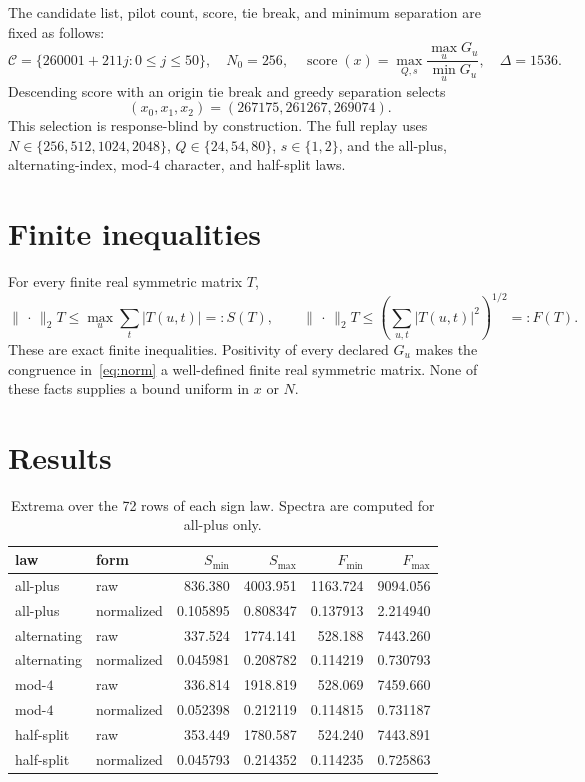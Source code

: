 \documentclass[10pt]{article}
\newcommand{\opnorm}{\lVert\,\cdot\,\rVert_2}
\begin{document}
The candidate list, pilot count, score, tie break, and minimum separation are
fixed as follows:
\begin{equation}
 \mathcal C=\{260001+211j:0\leq j\leq50\},\quad N_0=256,
 \quad \operatorname{score}(x)=\max_{Q,s}\frac{\max_uG_u}{\min_uG_u},
 \quad \Delta=1536.
\end{equation}
Descending score with an origin tie break and greedy separation selects
\begin{equation}
 (x_0,x_1,x_2)=(267175,261267,269074).
 \label{eq:origins}
\end{equation}
This selection is response-blind by construction.  The full replay uses
$N\in\{256,512,1024,2048\}$, $Q\in\{24,54,80\}$, $s\in\{1,2\}$, and the
all-plus, alternating-index, mod-$4$ character, and half-split laws.

\section{Finite inequalities}

For every finite real symmetric matrix $T$,
\begin{equation}
 \opnorm{T}\leq\max_u\sum_t|T(u,t)|=:S(T),
 \qquad \opnorm{T}\leq\left(\sum_{u,t}|T(u,t)|^2\right)^{1/2}=:F(T).
 \label{eq:envelopes}
\end{equation}
These are exact finite inequalities.  Positivity of every declared $G_u$ makes
the congruence in~\eqref{eq:norm} a well-defined finite real symmetric matrix.
None of these facts supplies a bound uniform in $x$ or $N$.

\section{Results}

\begin{table}[t]
\centering
\caption{Extrema over the 72 rows of each sign law.  Spectra are computed for
all-plus only.}
\small
\begin{tabular}{llrrrr}
\toprule
law & form & $S_{\min}$ & $S_{\max}$ & $F_{\min}$ & $F_{\max}$\\
\midrule
all-plus & raw & 836.380 & 4003.951 & 1163.724 & 9094.056\\
all-plus & normalized & 0.105895 & 0.808347 & 0.137913 & 2.214940\\
alternating & raw & 337.524 & 1774.141 & 528.188 & 7443.260\\
alternating & normalized & 0.045981 & 0.208782 & 0.114219 & 0.730793\\
mod-$4$ & raw & 336.814 & 1918.819 & 528.069 & 7459.660\\
mod-$4$ & normalized & 0.052398 & 0.212119 & 0.114815 & 0.731187\\
half-split & raw & 353.449 & 1780.587 & 524.240 & 7443.891\\
half-split & normalized & 0.045793 & 0.214352 & 0.114235 & 0.725863\\
\bottomrule
\end{tabular}
\end{table}
\end{document}
